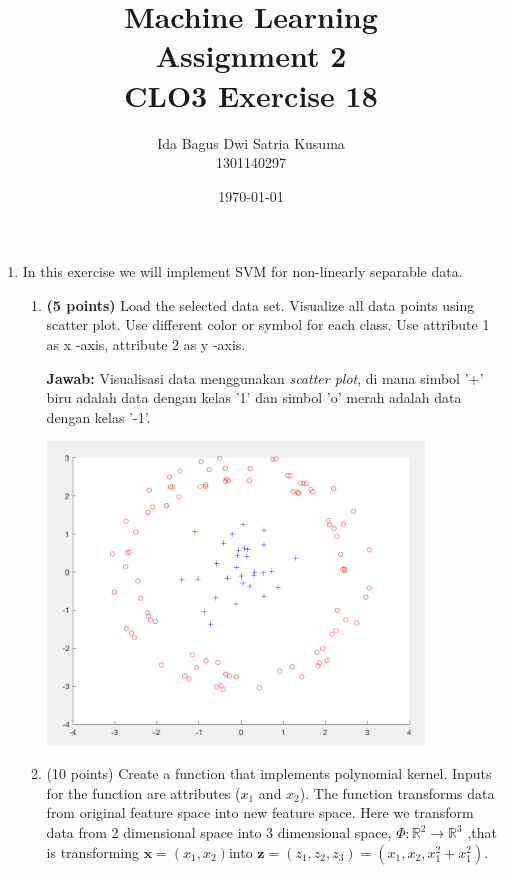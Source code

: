 \documentclass[12pt]{article}%
\begin{document}
\newcommand\scalemath[2]{\scalebox{#1}{\mbox{\ensuremath{\displaystyle #2}}}}
\title{Machine Learning \protect\\ Assignment 2 \protect\\ CLO3 Exercise 18} 
\author{Ida Bagus Dwi Satria Kusuma \protect\\ 1301140297}
\date{\today}
\maketitle

\begin{enumerate}
	\item In this exercise we will implement SVM for non-linearly separable data.
	\begin{enumerate}
		\item \textbf{(5 points)} Load the selected data set. Visualize all data points using scatter plot. Use different color or symbol for each class. Use attribute 1 as x -axis, attribute 2 as y -axis.

		\par \textbf{Jawab:} Visualisasi data menggunakan \textit{scatter plot}, di mana simbol '+' biru adalah data dengan kelas '1' dan simbol 'o' merah adalah data dengan kelas '-1'.
		\par \includegraphics[width=10cm]{ass2clo3no18_1} 

		\item (10 points) Create a function that implements polynomial kernel. Inputs for the function are attributes ($x_1$ and $x_2$). The function transforms data from original feature space into new feature space. Here we transform data from 2 dimensional space into 3 dimensional space, $\Phi:\mathbb{R}^2 \rightarrow \mathbb{R}^3$ ,that is transforming $\textbf{x}=(x_1,x_2)$into $\textbf{z}=(z_1,z_2,z_3)=(x_1,x_2,x^2_1+x^2_1)$.


\end{enumerate}
\end{enumerate}
\end{document}
